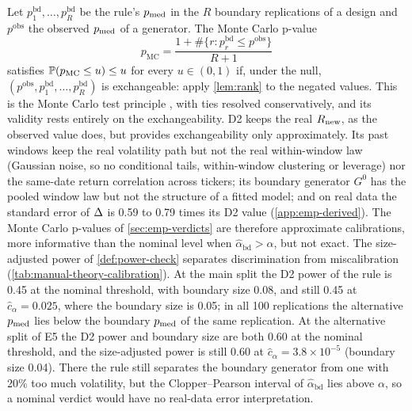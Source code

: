 \begin{remark}\label{rem:calibrated-bad}
Let $p^{\mathrm{bd}}_1,\dots,p^{\mathrm{bd}}_R$ be the rule's $p_{\mathrm{med}}$ in the $R$ boundary
replications of a design and $p^{\mathrm{obs}}$ the observed $p_{\mathrm{med}}$ of a generator. The Monte
Carlo p-value
\[
  p_{\mathrm{MC}}=\frac{1+\#\{r:p^{\mathrm{bd}}_r\le p^{\mathrm{obs}}\}}{R+1}
\]
satisfies $\mathbb{P}(p_{\mathrm{MC}}\le u)\le u$ for every $u\in(0,1)$ if, under the null,
$(p^{\mathrm{obs}},p^{\mathrm{bd}}_1,\dots,p^{\mathrm{bd}}_R)$ is exchangeable: apply
\cref{lem:rank} to the negated values. This is the Monte Carlo test principle
\citep{dufour_2006_monte}, with ties resolved conservatively, and its validity rests entirely on
the exchangeability. D2 keeps the real $R_{\mathrm{new}}$, as the observed value does, but provides
exchangeability only approximately. Its past windows keep the real \TRAIN{} volatility path but
not the real within-window law (Gaussian noise, so no conditional tails, within-window clustering
or leverage) nor the same-date return correlation across tickers; its boundary generator $G^0$
has the pooled \TRAIN{} window law but not the structure of a fitted model; and on real data the
standard error of $\Delta$ is 0.59 to 0.79 times its D2 value (\cref{app:emp-derived}). The Monte
Carlo p-values of \cref{sec:emp-verdicts} are therefore approximate calibrations, more
informative than the nominal level when $\hat\alpha_{\mathrm{bd}}>\alpha$, but not exact. The
size-adjusted power of \cref{def:power-check} separates discrimination from miscalibration
(\cref{tab:manual-theory-calibration}). At the main split the D2 power of the rule is 0.45 at the
nominal threshold, with boundary size 0.08, and still 0.45 at $\hat c_\alpha=0.025$, where the
boundary size is 0.05; in all 100 replications the alternative $p_{\mathrm{med}}$ lies below the boundary
$p_{\mathrm{med}}$ of the same replication. At the alternative split of E5 the D2 power and boundary size are
both 0.60 at the nominal threshold, and the size-adjusted power is still 0.60 at
$\hat c_\alpha=3.8\times10^{-5}$ (boundary size 0.04). There the rule still separates the boundary
generator from one with 20\% too much volatility, but the Clopper--Pearson interval of
$\hat\alpha_{\mathrm{bd}}$ lies above $\alpha$, so a nominal \BAD{} verdict would have no
real-data error interpretation.
\end{remark}

